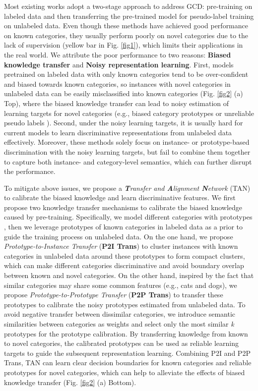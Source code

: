 \documentclass[letterpaper]{article} %
\begin{document}
Most existing works \citep{pretrain,dpn,diffusion} adopt a two-stage approach to address GCD: pre-training on labeled data and then transferring the pre-trained model for pseudo-label training on unlabeled data. Even though these methods have achieved good performance on known categories, they usually perform poorly on novel categories due to the lack of supervision (yellow bar in Fig. \ref{fig1}), which limits their applications in the real world.
We attribute the poor performance to two reasons: \textbf{Biased knowledge transfer} and \textbf{Noisy representation learning}.
First, models pretrained on labeled data with only known categories tend to be over-confident and biased towards known categories, so instances with novel categories in unlabeled data can be easily misclassified into known categories (Fig. \ref{fig2} (a) Top), where the biased knowledge transfer can lead to noisy estimation of learning targets for novel categories (e.g., biased category prototypes \citep{dpn} or unreliable pseudo labels \citep{thu2021}).
Second, under the noisy learning targets, it is usually hard for current models to learn discriminative representations from unlabeled data effectively. Moreover, these methods solely focus on instance- \citep{gcd} or prototype-based discrimination \citep{dpn} with the noisy learning targets, but fail to combine them together to capture both instance- and category-level semantics, which can further disrupt the performance.


To mitigate above issues, we propose a \textit{\textbf{T}ransfer and \textbf{A}lignment \textbf{N}etwork} (TAN) to calibrate the biased knowledge and learn discriminative features.
We first propose two knowledge transfer mechanisms to calibrate the biased knowledge caused by pre-training.
Specifically, we model different categories with prototypes \citep{proto}, then we leverage prototypes of known categories in labeled data as a prior to guide the training process on unlabeled data.
On the one hand, we propose \textit{Prototype-to-Instance Transfer} (\textbf{P2I Trans}) to cluster instances with known categories in unlabeled data around these prototypes to form compact clusters, which can make different categories discriminative and avoid boundary overlap between known and novel categories.
On the other hand, inspired by the fact that similar categories may share some common features (e.g., cats and dogs), we propose \textit{Prototype-to-Prototype Transfer} (\textbf{P2P Trans}) to transfer these prototypes to calibrate the noisy prototypes estimated from unlabeled data. To avoid negative transfer between dissimilar categories, we introduce semantic similarities between categories as weights and select only the most similar \textit{k} prototypes for the prototype calibration. By transferring knowledge from known to novel categories, the calibrated prototypes can be used as reliable learning targets to guide the subsequent representation learning.
Combining P2I and P2P Trans, TAN can learn clear decision boundaries for known categories and reliable prototypes for novel categories, which can help to alleviate the effects of biased knowledge transfer (Fig. \ref{fig2} (a) Bottom).
\end{document}
